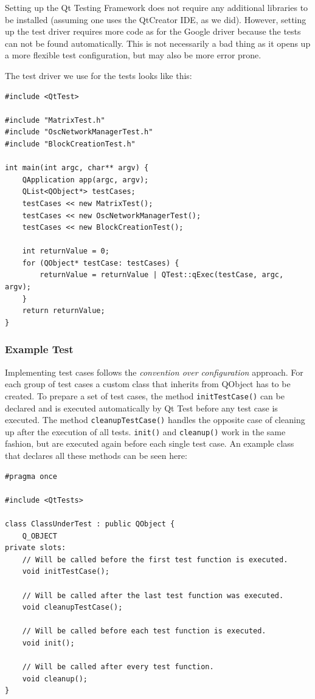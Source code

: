 \documentclass{scrreprt}
\begin{document}
Setting up the Qt Testing Framework does not require any additional libraries to be installed (assuming one uses the QtCreator IDE, as we did). However, setting up the test driver requires more code as for the Google driver because the tests can not be found automatically. This is not necessarily a bad thing as it opens up a more flexible test configuration, but may also be more error prone.

The test driver we use for the tests looks like this:

\bigskip
\begin{lstlisting}[title=tests-qt/main.cpp]
#include <QtTest>

#include "MatrixTest.h"
#include "OscNetworkManagerTest.h"
#include "BlockCreationTest.h"

int main(int argc, char** argv) {
	QApplication app(argc, argv);	
	QList<QObject*> testCases;
	testCases << new MatrixTest();
	testCases << new OscNetworkManagerTest();
	testCases << new BlockCreationTest();
	
	int returnValue = 0;
	for (QObject* testCase: testCases) {
		returnValue = returnValue | QTest::qExec(testCase, argc, argv);
	}
	return returnValue;
}
\end{lstlisting}
\bigskip

\subsubsection{Example Test}

Implementing test cases follows the \textit{convention over configuration} approach. For each group of test cases a custom class that inherits from QObject has to be created. To prepare a set of test cases, the method \texttt{initTestCase()} can be declared and is executed automatically by Qt Test before any test case is executed. The method \texttt{cleanupTestCase()} handles the opposite case of cleaning up after the execution of all tests. \texttt{init()} and \texttt{cleanup()} work in the same fashion, but are executed again before each single test case. An example class that declares all these methods can be seen here:

\bigskip
\begin{lstlisting}[title=tests-qt/ClassUnderTest.h]
#pragma once

#include <QtTests>

class ClassUnderTest : public QObject {
	Q_OBJECT
private slots:
	// Will be called before the first test function is executed.
	void initTestCase();
	
	// Will be called after the last test function was executed.
	void cleanupTestCase();
	
	// Will be called before each test function is executed.
	void init();
	
	// Will be called after every test function.
	void cleanup();
}
\end{lstlisting}
\bigskip
\end{document}
